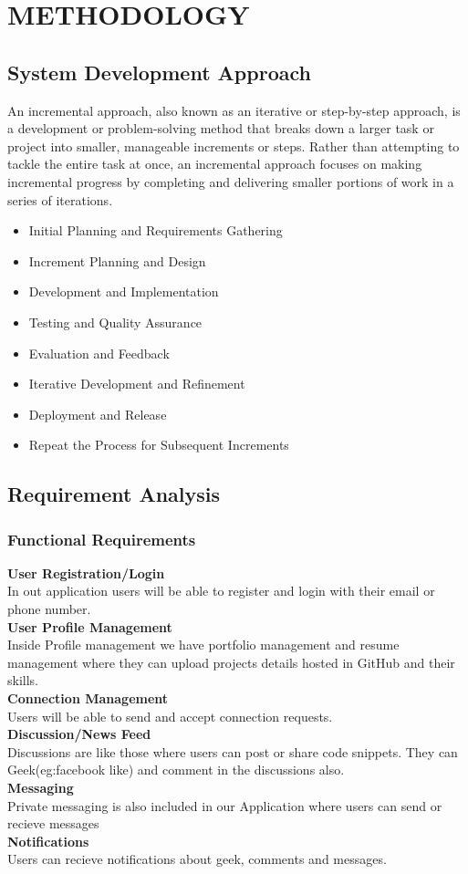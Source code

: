 \chapter{METHODOLOGY}
\section{System Development Approach}
An incremental approach, also known as an iterative or step-by-step approach, is a development or problem-solving method that breaks down a larger task or project into smaller, manageable increments or steps. Rather than attempting to tackle the entire task at once, an incremental approach focuses on making incremental progress by completing and delivering smaller portions of work in a series of iterations.
\begin{itemize}
    \setlength\itemsep{0.25em}
    \item Initial Planning and Requirements Gathering
    \item Increment Planning and Design
    \item Development and Implementation
    \item Testing and Quality Assurance
    \item Evaluation and Feedback
    \item Iterative Development and Refinement
    \item Deployment and Release
    \item Repeat the Process for Subsequent Increments
\end{itemize}
\section{Requirement Analysis}
\subsection{Functional Requirements}
\textbf{User Registration/Login}\\
In out application users will be able to register and login with their email or phone number.\\
\textbf{User Profile Management}\\
Inside Profile management we have portfolio management and resume management where they can upload projects details hosted in GitHub and their skills.\\
\textbf{Connection Management}\\
Users will be able to send and accept connection requests.\\
\textbf{Discussion/News Feed}\\
Discussions are like those where users can post or share code snippets. They can Geek(eg:facebook like) and comment in the discussions also.\\
\textbf{Messaging}\\
Private messaging is also included in our Application where users can send or recieve messages\\
\textbf{Notifications}\\
Users can recieve notifications about geek, comments and messages.\\
